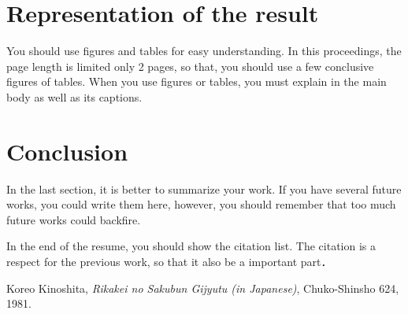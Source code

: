 \documentclass[twocolumn, a4paper]{UECIEresumeE}
\begin{document}
\section{Representation of the result}
You should use figures and tables for easy understanding.
In this proceedings, the page length is limited only 2 pages, so that,
you should use a few conclusive figures of tables.
When you use figures or tables, you must explain in the main body as well as its captions.


\section{Conclusion}
In the last section, it is better to summarize your work. If you have several future works, you could write them here, however, you should remember that too much future works could backfire.

In the end of the resume, you should show the citation list.
The citation is a respect for the previous work, so that it also be a 
important part\cite{Kinoshita1}．


{\small
\begin{thebibliography}{*}
 Koreo Kinoshita, \textit{Rikakei no Sakubun Gijyutu (in Japanese)}, Chuko-Shinsho 624, 1981.
\end{thebibliography}
}
\end{document}
